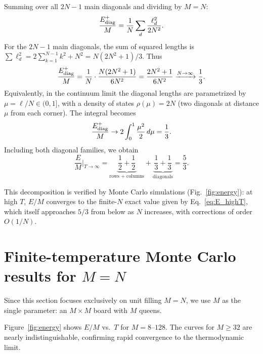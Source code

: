 \documentclass[aps, pre, reprint, amsmath, amssymb, superscriptaddress, floatfix]{revtex4-2}
\begin{document}
Summing over all $2N - 1$ main diagonals and dividing by $M = N$:
\begin{equation}
  \frac{E_{\rm diag}^+}{M} = \frac{1}{N} \sum_{d}
  \frac{\ell_d^2}{2N^2}.
  \label{eq:E_diag_sum}
\end{equation}
For the $2N - 1$ main diagonals, the sum of squared lengths is
$\sum \ell_d^2 = 2\sum_{k=1}^{N-1} k^2 + N^2 = N(2N^2+1)/3$.
Thus
\begin{equation}
  \frac{E_{\rm diag}^+}{M}
  = \frac{1}{N} \cdot \frac{N(2N^2+1)}{6N^2}
  = \frac{2N^2+1}{6N^2}
  \xrightarrow{N \to \infty} \frac{1}{3}.
  \label{eq:E_diag_exact}
\end{equation}
Equivalently, in the continuum limit the diagonal lengths are
parametrized by $\mu = \ell/N \in (0, 1]$, with a density of states
$\rho(\mu) = 2N$ (two diagonals at distance $\mu$ from each corner).
The integral becomes
\begin{equation}
  \frac{E_{\rm diag}^+}{M}
  \to 2\int_0^1 \frac{\mu^2}{2}\,d\mu = \frac{1}{3}.
  \label{eq:E_diag}
\end{equation}
Including both diagonal families, we obtain
\begin{equation}
  \frac{E}{M}\bigg|_{T \to \infty}
  = \underbrace{\frac{1}{2} + \frac{1}{2}}_{\text{rows + columns}}
  + \underbrace{\frac{1}{3} + \frac{1}{3}}_{\text{diagonals}}
  = \frac{5}{3}.
  \label{eq:53}
\end{equation}

This decomposition is verified by Monte Carlo simulations
(Fig.~\ref{fig:energy}): at high $T$, $E/M$ converges to the
finite-$N$ exact value given by Eq.~\eqref{eq:E_highT}, which
itself approaches $5/3$ from below as $N$ increases, with
corrections of order $O(1/N)$.


\section{Finite-temperature Monte Carlo results for \texorpdfstring{$M = N$}{M=N}}
\label{sec:mc}

Since this section focuses exclusively on unit filling $M = N$, we
use $M$ as the single parameter: an $M \times M$ board with $M$
queens.

Figure~\ref{fig:energy} shows $E/M$ vs.\ $T$ for $M = 8$--$128$.
The curves for $M \ge 32$ are nearly indistinguishable, confirming
rapid convergence to the thermodynamic limit.
\end{document}
